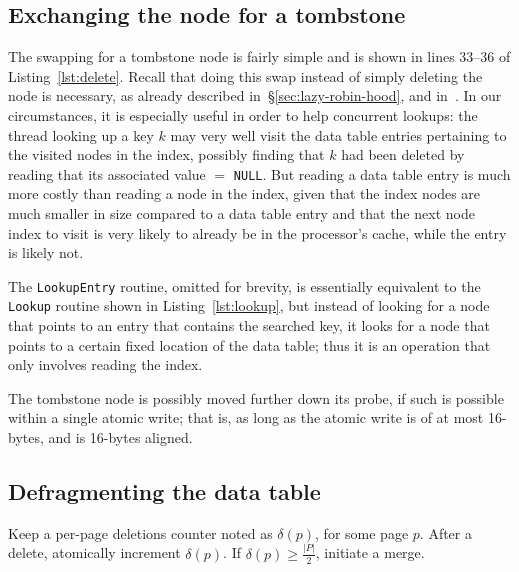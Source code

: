 \subsection{Exchanging the node for a tombstone}\label{subsec:exchanging-node-tombstone}

The swapping for a tombstone node is fairly simple and is shown in lines 33--36 of Listing~\ref{lst:delete}.
Recall that doing this swap instead of simply deleting the node is necessary, as already described in~\S\ref{sec:lazy-robin-hood}, and in~\cite[\S6.4]{the-art-vol-2}.
In our circumstances, it is especially useful in order to help concurrent lookups: the thread looking up a key $k$ may very well visit the data table entries pertaining to the visited nodes in the index, possibly finding that $k$ had been deleted by reading that its associated value $=$ \texttt{NULL}.
But reading a data table entry is much more costly than reading a node in the index, given that the index nodes are much smaller in size compared to a data table entry and that the next node index to visit is very likely to already be in the processor's cache, while the entry is likely not.

The \texttt{LookupEntry} routine, omitted for brevity, is essentially equivalent to the \texttt{Lookup} routine shown in Listing~\ref{lst:lookup}, but instead of looking for a node that points to an entry that contains the searched key, it looks for a node that points to a certain fixed location of the data table; thus it is an operation that only involves reading the index.

The tombstone node is possibly moved further down its probe, if such is possible within a single atomic write; that is, as long as the atomic write is of at most 16-bytes, and is 16-bytes aligned.

\subsection{Defragmenting the data table}\label{subsec:defragmenting}

Keep a per-page deletions counter noted as $\delta(p)$, for some page $p$.
After a delete, atomically increment $\delta(p)$.
If $\delta(p) \geq \frac{|P|}{2}$, initiate a merge.

